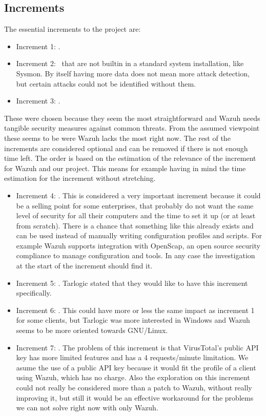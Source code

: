 \subsection{Increments} \label{increments}
The essential increments to the project are:
\begin{itemize}
	\item Increment 1: \IncrementoUno.
	\item Increment 2: \IncrementoDos \ that are not builtin in a standard system installation, like Sysmon. By itself having more data does not mean more attack detection, but certain attacks could not be identified without them.
	\item Increment 3: \IncrementoTres.
\end{itemize}
\linej
These were chosen because they seem the most straightforward and Wazuh needs tangible security measures against common threats. From the assumed viewpoint these seems to be were Wazuh lacks the most right now.
\linej
\linej
The rest of the increments are considered optional and can be removed if there is not enough time left. The order is based on the estimation of the relevance of the increment for Wazuh and our project. This means for example having in mind the time estimation for the increment without stretching.
\begin{itemize}
	\item Increment 4: \IncrementoCuatro. This is considered a very important increment because it could be a selling point for some enterprises, that probably do not want the same level of security for all their computers and the time to set it up (or at least from scratch). There is a chance that something like this already exists and can be used instead of manually writing configuration profiles and scripts. For example Wazuh supports integration with OpenScap, an open source security compliance to manage configuration and tools. In any case the investigation at the start of the increment should find it.
	\item Increment 5: \IncrementoCinco. Tarlogic stated that they would like to have this increment specifically.
	\item Increment 6: \IncrementoSeis. This could have more or less the same impact as increment 1 for some clients, but Tarlogic was more interested in Windows and Wazuh seems to be more oriented towards GNU/Linux.
	\item Increment 7: \IncrementoSiete. The problem of this increment is that VirusTotal's public API key has more limited features and has a 4 requests/minute limitation\cite{virustotal_faq}. We asume the use of a public API key because it would fit the profile of a client using Wazuh, which has no charge. Also the exploration on this increment could not really be considered more than a patch to Wazuh, without really improving it, but still it would be an effective workaround for the problems we can not solve right now with only Wazuh.
\end{itemize}

